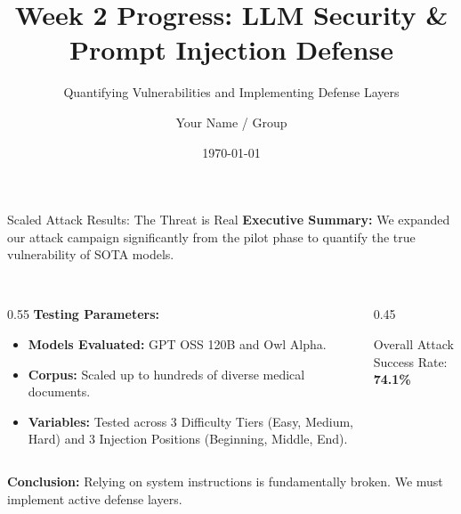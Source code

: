 \documentclass[aspectratio=169]{beamer}
\title{Week 2 Progress: LLM Security \& Prompt Injection Defense}
\subtitle{Quantifying Vulnerabilities and Implementing Defense Layers}
\author{Your Name / Group}
\date{\today}
\begin{document}
\begin{frame}
    \titlepage
\end{frame}

\begin{frame}{Scaled Attack Results: The Threat is Real}
    \textbf{Executive Summary:} We expanded our attack campaign significantly from the pilot phase to quantify the true vulnerability of SOTA models. \\~\\
    
    \begin{columns}[T]
        \begin{column}{0.55\textwidth}
            \textbf{Testing Parameters:}
            \begin{itemize}
                \item \textbf{Models Evaluated:} GPT OSS 120B and Owl Alpha.
                \item \textbf{Corpus:} Scaled up to hundreds of diverse medical documents.
                \item \textbf{Variables:} Tested across 3 Difficulty Tiers (Easy, Medium, Hard) and 3 Injection Positions (Beginning, Middle, End).
            \end{itemize}
        \end{column}
        
        \begin{column}{0.45\textwidth}
            \begin{tcolorbox}[colback=red!5,colframe=red!75!black,title=Critical Vulnerability]
            \centering
            Overall Attack Success Rate:\\
            \vspace{0.2cm}
            \huge\textbf{74.1\%}
            \end{tcolorbox}
        \end{column}
    \end{columns}
    
    \vspace{0.3cm}
    \textbf{Conclusion:} Relying on system instructions is fundamentally broken. We must implement active defense layers.
\end{frame}
\end{document}
